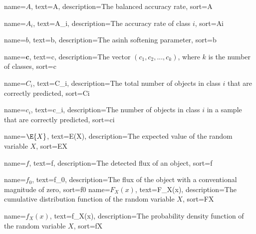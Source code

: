 

\providecommand\given{}
\DeclarePairedDelimiterXPP\E[1]{\mathbb{E}}{[}{]}{}{
	\renewcommand\given{  \nonscript\:
		\delimsize\vert
		\nonscript\:
		\mathopen{}
		\allowbreak}
	#1
}
\DeclarePairedDelimiterXPP\Prob[1]{\mathbb{P}}{(}{)}{}{
	\renewcommand\given{  \nonscript\:
		\delimsize\vert
		\nonscript\:
		\mathopen{}
		\allowbreak}
	#1
}

\DeclareMathOperator{\Beta}{Beta}
\DeclareMathOperator{\Bin}{Bin}
\DeclareMathOperator{\arsinh}{arsinh}


%
{%
	name={$A$},
	text={A},
	description={The balanced accuracy rate},
	sort={A}
}

%
{%
	name={$A_i$},
	text={A_i},
	description={The accuracy rate of class $i$},
	sort={Ai}
}

%
{%
	name={$b$},
	text={b},
	description={The asinh softening parameter},
	sort={b}
}

%
{%
	name={$\bm{c}$},
	text={c},
	description={The vector $(c_1, c_2,...,c_k)$, where $k$ is the number of classes},
	sort={c}
}

%
{%
	name={$C_i$},
	text={C_i},
	description={The total number of objects in class $i$ that are correctly predicted},
	sort={Ci}
}

%
{%
	name={$c_i$},
	text={c_i},
	description={The number of objects in class $i$ in a sample that are correctly predicted},
	sort={ci}
}

%
{%
	name={$\E{X}$},
	text={E(X)},
	description={The expected value of the random variable $X$},
	sort={EX}
}

%
{%
	name={$f$},
	text={f},
	description={The detected flux of an object},
	sort={f}
}

%
{%
	name={$f_0$},
	text={f_0},
	description={The flux of the object with a conventional magnitude of zero},
	sort={f0}
}
%
{%
	name={$F_X(x)$},
	text={F_X(x)},
	description={The cumulative distribution function of the random variable $X$},
	sort={FX}
}

%
{%
	name={$f_X(x)$},
	text={f_X(x)},
	description={The probability density function of the random variable $X$},
	sort={fX}
}

